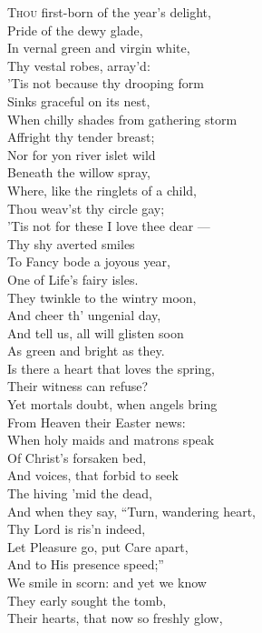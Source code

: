 \textsc{Thou} first-born of the year’s delight, \\
 Pride of the dewy glade, \\
 In vernal green and virgin white, \\
 Thy vestal robes, array’d: \\
  ’Tis not because thy drooping form \\
 Sinks graceful on its nest, \\
 When chilly shades from gathering storm \\
 Affright thy tender breast; \\
  Nor for yon river islet wild \\
 Beneath the willow spray, \\
 Where, like the ringlets of a child, \\
 Thou weav’st thy circle gay; \\
  ’Tis not for these I love thee dear — \\
 Thy shy averted smiles \\
 To Fancy bode a joyous year, \\
 One of Life’s fairy isles. \\
  They twinkle to the wintry moon, \\
 And cheer th’ ungenial day, \\
 And tell us, all will glisten soon \\
 As green and bright as they. \\
  Is there a heart that loves the spring, \\
 Their witness can refuse? \\
 Yet mortals doubt, when angels bring \\
 From Heaven their Easter news: \\
  When holy maids and matrons speak \\
 Of Christ’s forsaken bed, \\
 And voices, that forbid to seek \\
 The hiving ’mid the dead, \\
  And when they say, “Turn, wandering heart, \\
 Thy Lord is ris’n indeed, \\
 Let Pleasure go, put Care apart, \\
 And to His presence speed;” \\
  We smile in scorn: and yet we know \\
 They early sought the tomb, \\
 Their hearts, that now so freshly glow, \\
